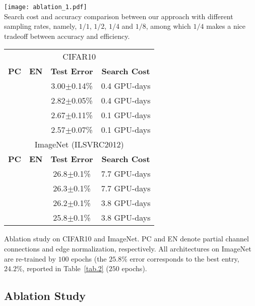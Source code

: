 \documentclass{article} \usepackage{iclr2020_conference,times}
\newcommand{\cmark}{\ding{51}}\newcommand{\xmark}{\ding{55}}\usepackage[misc]{ifsym}
\begin{document}
\makeatletter{}\makeatother
\begin{minipage}{.45\textwidth}
\centering
\vspace{0.2cm}
\texttt{[image: ablation\_1.pdf]}\\
\caption{Search cost and accuracy comparison between our approach with different sampling rates, namely, $1/1$, $1/2$, $1/4$ and $1/8$, among which $1/4$ makes a nice tradeoff between accuracy and efficiency.}
\label{fig:sampling}
\end{minipage}
\makeatletter{}\makeatother
\hfill
\begin{minipage}{.5\textwidth}
\centering
\small
\begin{tabular}{cccc}
\hline
\multicolumn{4}{c}{CIFAR10}\\
\textbf{PC}&\textbf{EN} & \textbf{Test Error} &\textbf{Search Cost}\\
\hline
\xmark& \xmark& 3.00$\pm$0.14\%& 0.4 GPU-days\\
\xmark& \cmark& 2.82$\pm$0.05\%& 0.4 GPU-days\\
\cmark& \xmark& 2.67$\pm$0.11\%& 0.1 GPU-days\\
\cmark& \cmark& 2.57$\pm$0.07\%& 0.1 GPU-days\\
\hline
\hline
\multicolumn{4}{c}{ImageNet (ILSVRC2012)}\\
\textbf{PC}&\textbf{EN} & \textbf{Test Error} &\textbf{Search Cost}\\
\hline
\xmark& \xmark& 26.8$\pm$0.1\%& 7.7 GPU-days\\
\xmark& \cmark& 26.3$\pm$0.1\%& 7.7 GPU-days\\
\cmark& \xmark& 26.2$\pm$0.1\%& 3.8 GPU-days\\
\cmark& \cmark& 25.8$\pm$0.1\%& 3.8 GPU-days\\
\hline			
\end{tabular}
\caption{Ablation study on CIFAR10 and ImageNet. PC and EN denote partial channel connections and edge normalization, respectively. All architectures on ImageNet are re-trained by $100$ epochs (the $25.8\%$ error corresponds to the best entry, $24.2\%$, reported in Table~\ref{tab.2} ($250$ epochs).}
\label{tab:components}
\end{minipage}

\subsection{Ablation Study}
\label{Experiments:Ablation}
\end{document}
